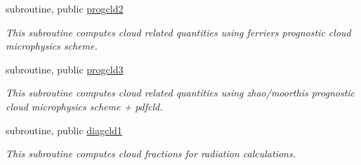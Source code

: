 {\bf }\par
\begin{DoxyCompactItemize}
\item 
subroutine, public \hyperlink{group__module__radiation__clouds_ga1651dc559f22ee01b28dd49fd25112d6}{progcld2}
\begin{DoxyCompactList}\small\item\em This subroutine computes cloud related quantities using ferrier\textquotesingle{}s prognostic cloud microphysics scheme. \end{DoxyCompactList}\end{DoxyCompactItemize}

{\bf }\par
\begin{DoxyCompactItemize}
\item 
subroutine, public \hyperlink{group__module__radiation__clouds_ga51a721a68d1bb9f5b2d8b1541aacf28d}{progcld3}
\begin{DoxyCompactList}\small\item\em This subroutine computes cloud related quantities using zhao/moorthi\textquotesingle{}s prognostic cloud microphysics scheme + pdfcld. \end{DoxyCompactList}\end{DoxyCompactItemize}

{\bf }\par
\begin{DoxyCompactItemize}
\item 
subroutine, public \hyperlink{group__module__radiation__clouds_gab477be986b08fe827c44dbe352a23d39}{diagcld1}
\begin{DoxyCompactList}\small\item\em This subroutine computes cloud fractions for radiation calculations. \end{DoxyCompactList}\end{DoxyCompactItemize}

